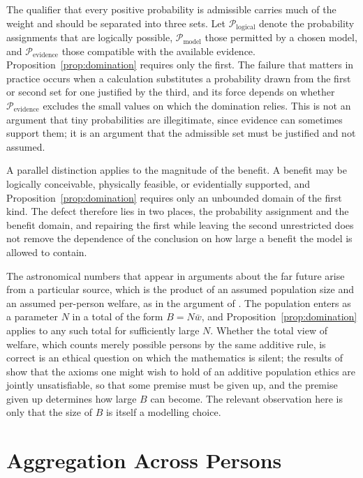 \documentclass[11pt]{article}
\theoremstyle{definition}
\theoremstyle{remark}
\begin{document}
The qualifier that every positive probability is admissible carries much of the weight and should be separated into three sets. Let $\mathcal P_{\mathrm{logical}}$ denote the probability assignments that are logically possible, $\mathcal P_{\mathrm{model}}$ those permitted by a chosen model, and $\mathcal P_{\mathrm{evidence}}$ those compatible with the available evidence. Proposition~\ref{prop:domination} requires only the first. The failure that matters in practice occurs when a calculation substitutes a probability drawn from the first or second set for one justified by the third, and its force depends on whether $\mathcal P_{\mathrm{evidence}}$ excludes the small values on which the domination relies. This is not an argument that tiny probabilities are illegitimate, since evidence can sometimes support them; it is an argument that the admissible set must be justified and not assumed.

A parallel distinction applies to the magnitude of the benefit. A benefit may be logically conceivable, physically feasible, or evidentially supported, and Proposition~\ref{prop:domination} requires only an unbounded domain of the first kind. The defect therefore lies in two places, the probability assignment and the benefit domain, and repairing the first while leaving the second unrestricted does not remove the dependence of the conclusion on how large a benefit the model is allowed to contain.

The astronomical numbers that appear in arguments about the far future arise from a particular source, which is the product of an assumed population size and an assumed per-person welfare, as in the argument of \citet{bostrom2003}. The population enters as a parameter $N$ in a total of the form $B=N\bar w$, and Proposition~\ref{prop:domination} applies to any such total for sufficiently large $N$. Whether the total view of welfare, which counts merely possible persons by the same additive rule, is correct is an ethical question on which the mathematics is silent; the results of \citet{arrhenius2000} show that the axioms one might wish to hold of an additive population ethics are jointly unsatisfiable, so that some premise must be given up, and the premise given up determines how large $B$ can become. The relevant observation here is only that the size of $B$ is itself a modelling choice.

\section{Aggregation Across Persons}
\label{sec:agg}
\end{document}
